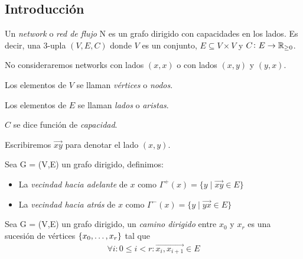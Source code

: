 \subsection{Introducción}

\begin{definition}
  Un \emph{network} o \emph{red de flujo}  N es un grafo dirigido con capacidades
  en los lados. Es decir, una $3$-upla $(V, E, C)$ donde $V$ es un conjunto,
  $E \subseteq V \times V$ y $C \colon E \to \mathbb{R}_{\ge 0}$.

  No consideraremos networks con lados $(x,x)$ o con lados $(x,y)$ y $(y,x)$.
\end{definition}

\begin{notation}
  Los elementos de $V$ se llaman \emph{vértices} o \emph{nodos}.

  Los elementos de $E$ se llaman \emph{lados} o \emph{aristas}.

  $C$ se dice función de \emph{capacidad}.

  Escribiremos $\overrightarrow{xy}$ para denotar el lado $(x,y)$.
\end{notation}

\begin{definition}
  Sea G = (V,E) un grafo dirigido, definimos:
  \begin{itemize}
  \item La \emph{vecindad hacia adelante} de $x$ como
    $\Gamma^{+}(x) = \{y\mid \overrightarrow{xy} \in E\}$
  \item La \emph{vecindad hacia atrás} de $x$ como
    $\Gamma^{-}(x) = \{y\mid \overrightarrow{yx} \in E\}$
  \end{itemize}
\end{definition}

\begin{definition}
Sea G = (V,E) un grafo dirigido, un \emph{camino dirigido} entre $x_0$ y $x_r$ es una sucesión de vértices $\{x_0,\mathellipsis, x_r\}$ tal que
\begin{align}
    \forall i: 0\le i < r : \overrightarrow{x_i,x_{i+1}} \in E
\end{align}
\end{definition}


